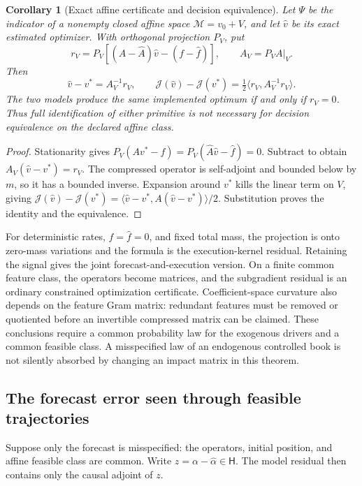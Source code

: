 \documentclass[11pt]{article}
\theoremstyle{plain}
\newtheorem{corollary}[theorem]{Corollary}
\theoremstyle{definition}
\theoremstyle{remark}
\newcommand{\ip}[2]{\langle#1,#2\rangle}
\begin{document}
\begin{corollary}[Exact affine certificate and decision equivalence]
\label{cor:affineresidual}
Let \(\Psi\) be the indicator of a nonempty closed affine space
\(\mathcal M=v_0+V\), and let \(\widehat v\) be its exact estimated
optimizer. With orthogonal projection \(P_V\), put
\[
r_V=P_V[(A-\widehat A)\widehat v-(f-\widehat f)],\qquad
A_V=P_VA|_V .
\]
Then
\begin{equation}\label{eq:affineexact}
\widehat v-v^\ast=A_V^{-1}r_V,\qquad
\mathcal J(\widehat v)-\mathcal J(v^\ast)
=\tfrac12\ip{r_V}{A_V^{-1}r_V}.
\end{equation}
The two models produce the same implemented optimum if and only
if \(r_V=0\). Thus full identification of either primitive is not
necessary for decision equivalence on the declared affine class.
\end{corollary}
\begin{proof}
Stationarity gives
\(P_V(Av^\ast-f)=P_V(\widehat A\widehat v-\widehat f)=0\).
Subtract to obtain \(A_V(\widehat v-v^\ast)=r_V\).
The compressed operator is self-adjoint and bounded below by \(m\),
so it has a bounded inverse. Expansion around \(v^\ast\) kills the
linear term on \(V\), giving
\(\mathcal J(\widehat v)-\mathcal J(v^\ast)
=\ip{\widehat v-v^\ast}{A(\widehat v-v^\ast)}/2\).
Substitution proves the identity and the equivalence.
\end{proof}

For deterministic rates, \(f=\widehat f=0\), and fixed total mass,
the projection is onto zero-mass variations and the formula is the
execution-kernel residual. Retaining the signal gives the joint
forecast-and-execution version. On a finite common feature class,
the operators become matrices, and the subgradient residual is
an ordinary constrained optimization certificate. Coefficient-space
curvature also depends on the feature Gram matrix: redundant features
must be removed or quotiented before an invertible compressed matrix
can be claimed.
These conclusions require a common probability law for the exogenous
drivers and a common feasible class. A misspecified law of an
endogenous controlled book is not silently absorbed by changing
an impact matrix in this theorem.

\subsection{The forecast error seen through feasible trajectories}

Suppose only the forecast is misspecified: the operators, initial
position, and affine feasible class are common. Write
\(z=\alpha-\widehat\alpha\in\mathsf H\). The model residual then
contains only the causal adjoint of \(z\).
\end{document}

